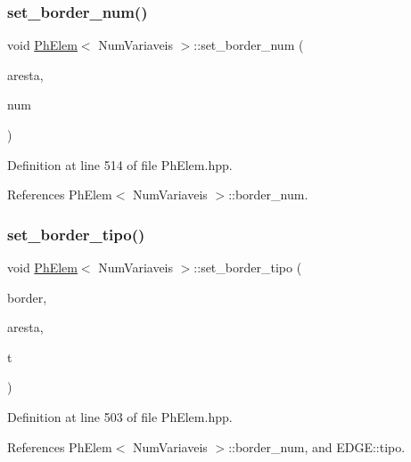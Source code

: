 \subsubsection{\texorpdfstring{set\+\_\+border\+\_\+num()}{set\_border\_num()}}
{\footnotesize\ttfamily void \hyperlink{classPhElem}{Ph\+Elem}$<$ Num\+Variaveis $>$\+::set\+\_\+border\+\_\+num (\begin{DoxyParamCaption}\item[{const int \&}]{aresta,  }\item[{const int \&}]{num }\end{DoxyParamCaption})\hspace{0.3cm}{\ttfamily [inherited]}}



Definition at line 514 of file Ph\+Elem.\+hpp.



References Ph\+Elem$<$ Num\+Variaveis $>$\+::border\+\_\+num.

\mbox{\label{classPhElem_aafd112d676dc3e16309e8ec8980f1c97}} 
\subsubsection{\texorpdfstring{set\+\_\+border\+\_\+tipo()}{set\_border\_tipo()}}
{\footnotesize\ttfamily void \hyperlink{classPhElem}{Ph\+Elem}$<$ Num\+Variaveis $>$\+::set\+\_\+border\+\_\+tipo (\begin{DoxyParamCaption}\item[{\hyperlink{structEDGE}{E\+D\+GE} $\ast$}]{border,  }\item[{const int \&}]{aresta,  }\item[{const int \&}]{t }\end{DoxyParamCaption})\hspace{0.3cm}{\ttfamily [inherited]}}



Definition at line 503 of file Ph\+Elem.\+hpp.



References Ph\+Elem$<$ Num\+Variaveis $>$\+::border\+\_\+num, and E\+D\+G\+E\+::tipo.

\mbox{\label{classDG__Elem_a9f7165dbb388e11f16b4249383f71d0e}} 
